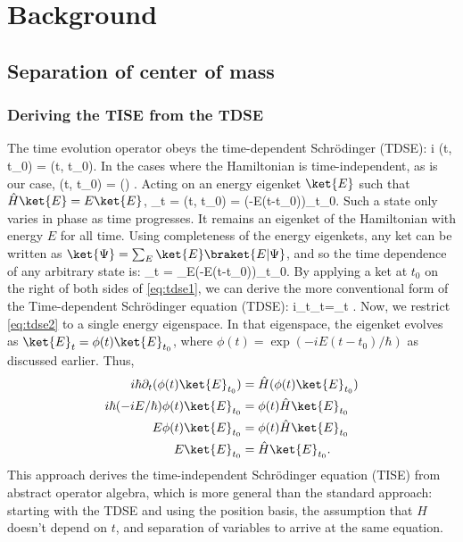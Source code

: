 \section{Background}

\subsection{Separation of center of mass}
\subsubsection{Deriving the TISE from the TDSE}
The time evolution operator obeys the time-dependent Schr{\"o}dinger (TDSE):
\be 
	i\hbar \; (t, t_0) = (t, t_0)\label{eq:tdse1}.
\ee
In the cases where the Hamiltonian is time-independent, as is our case, 
\be
	(t, t_0) = \exp\left(\right) \label{eq:timeevol}.
\ee
Acting on an energy eigenket $\ket{E}$ such that $\hat{H}\ket{E} = E\ket{E}$, 
\bea
	_t = (t, t_0) = \exp\left(-E(t-t_0)\right)_{t_0}.
\eea
Such a state only varies in phase as time progresses. It remains an eigenket of the Hamiltonian with energy $E$ for all time. Using completeness of the energy eigenkets, any ket can be written as $\ket{\Psi} = \sum_{E}\ket{E}\braket{E|\Psi}$, and so the time dependence of any arbitrary state is:
\bea
	\ket{\Psi}_t = \sum_E\exp\left(-E(t-t_0)\right)_{t_0}.
\eea
By applying a ket at $t_0$ on the right of both sides of \cref{eq:tdse1}, we can derive the more conventional form of the Time-dependent Schr{\"o}dinger equation (TDSE):
\be
	i\hbar\;\partial_t\ket{\Psi}_t=\ket{\Psi}_t \label{eq:tdse2}.
\ee
Now, we restrict \cref{eq:tdse2} to a single energy eigenspace. In that eigenspace, the eigenket evolves as $\ket{E}_t = \phi(t) \ket{E}_{t_0}$, where $\phi(t) =\exp(-iE(t-t_0)/\hbar)$ as discussed earlier. Thus, 
\begin{align*}
	i\hbar \partial_t(\phi(t)\ket{E}_{t_0}) &= \hat{H}(\phi(t)\ket{E}_{t_0}) \\
	i\hbar(-iE/\hbar)\phi(t)\ket{E}_{t_0} &= \phi(t)\hat{H}\ket{E}_{t_0} \\
	E\phi(t)\ket{E}_{t_0} &= \phi(t) \hat{H}\ket{E}_{t_0} \\
	E\ket{E}_{t_0} &= \hat{H}\ket{E}_{t_0}.
\end{align*}
This approach derives the time-independent Schr{\"o}dinger equation (TISE) from abstract operator algebra, which is more general than the standard approach: starting with the TDSE and using the position basis, the assumption that $H$ doesn't depend on $t$, and separation of variables to arrive at the same equation.

